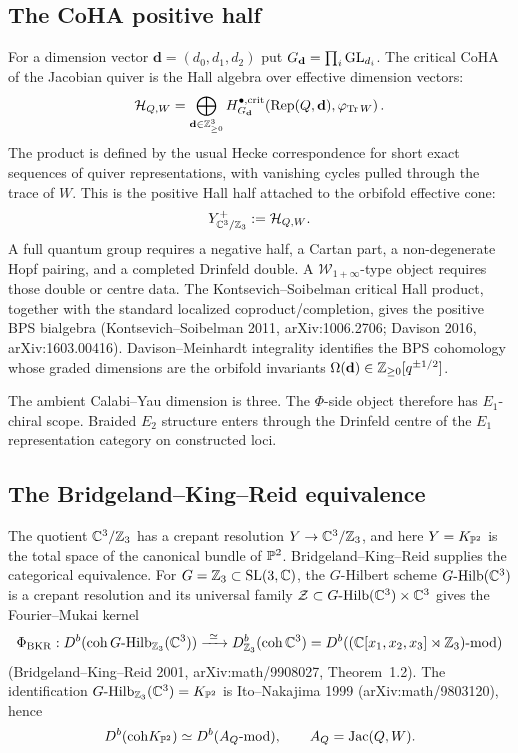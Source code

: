 \subsection*{The CoHA positive half}

For a dimension vector $\mathbf d=(d_0,d_1,d_2)$ put
$G_{\mathbf d}=\prod_i\mathrm{GL}_{d_i}$. The critical CoHA of the Jacobian
quiver is the Hall algebra over effective dimension vectors:
\[
  \mathcal{H}_{Q,W}
  =
  \bigoplus_{\mathbf{d}\in\mathbb{Z}_{\ge 0}^{3}}
  H^{\bullet,\mathrm{crit}}_{G_{\mathbf d}}\!\left(
    \mathrm{Rep}(Q,\mathbf{d}),
    \varphi_{\mathrm{Tr}\,W}
  \right).
\]
The product is defined by the usual Hecke correspondence for short
exact sequences of quiver representations, with vanishing cycles pulled
through the trace of $W$.
This is the positive Hall half attached to the orbifold effective cone:
\[
  Y^{+}_{\mathbb{C}^{3}/\mathbb{Z}_{3}} := \mathcal{H}_{Q,W}.
\]
A full quantum group requires a negative half, a Cartan part, a
non-degenerate Hopf pairing, and a completed Drinfeld double. A
$\mathcal{W}_{1+\infty}$-type object requires those double or centre
data. The Kontsevich--Soibelman critical Hall product, together with
the standard localized coproduct/completion, gives the positive BPS
bialgebra (Kontsevich--Soibelman 2011, arXiv:1006.2706; Davison 2016,
arXiv:1603.00416). Davison--Meinhardt integrality identifies the BPS
cohomology whose graded dimensions are the orbifold invariants
$\Omega(\mathbf{d})\in\mathbb{Z}_{\ge 0}[q^{\pm 1/2}]$.

The ambient Calabi--Yau dimension is three. The $\Phi$-side object
therefore has $E_1$-chiral scope. Braided $E_2$ structure enters through
the Drinfeld centre of the $E_1$ representation category on constructed
loci.

\subsection*{The Bridgeland--King--Reid equivalence}

The quotient $\mathbb{C}^3/\mathbb{Z}_3$ has a crepant resolution
$Y\to \mathbb{C}^3/\mathbb{Z}_3$, and here $Y=K_{\mathbb{P}^2}$ is the total space of the
canonical bundle of $\mathbb{P}^2$. Bridgeland--King--Reid supplies the
categorical equivalence. For
$G=\mathbb{Z}_3\subset\mathrm{SL}(3,\mathbb{C})$, the $G$-Hilbert scheme
$G\text{-}\mathrm{Hilb}(\mathbb{C}^3)$ is a crepant resolution and its universal family
$\mathcal{Z}\subset G\text{-}\mathrm{Hilb}(\mathbb{C}^3)\times\mathbb{C}^3$ gives the Fourier--Mukai
kernel
\[
  \Phi_{\mathrm{BKR}}:
  D^{b}(\mathrm{coh}\,G\text{-}\mathrm{Hilb}_{\mathbb{Z}_3}(\mathbb{C}^3))
  \xrightarrow{\ \simeq\ }
  D^{b}_{\mathbb{Z}_3}(\mathrm{coh}\,\mathbb{C}^3)
  =
  D^{b}\!\left((\mathbb{C}[x_1,x_2,x_3]\rtimes\mathbb{Z}_3)\text{-}\mathrm{mod}\right)
\]
(Bridgeland--King--Reid 2001, arXiv:math/9908027, Theorem~1.2). The
identification $G\text{-}\mathrm{Hilb}_{\mathbb{Z}_3}(\mathbb{C}^3)=K_{\mathbb{P}^2}$ is Ito--Nakajima 1999
(arXiv:math/9803120), hence
\[
  D^{b}(\mathrm{coh} K_{\mathbb{P}^2}) \simeq D^{b}(A_Q\text{-}\mathrm{mod}),
  \qquad A_Q=\mathrm{Jac}(Q,W).
\]

